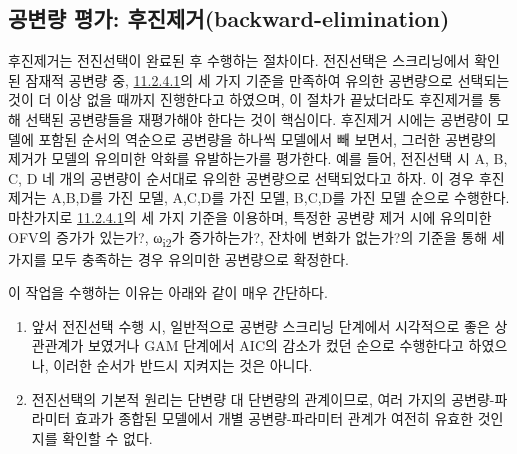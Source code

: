 \documentclass[
  10pt,
  krantz2,
  a4paper]{krantz}
\providecommand{\tightlist}{%
  \setlength{\itemsep}{0pt}\setlength{\parskip}{0pt}}
\theoremstyle{definition}
\theoremstyle{definition}
\theoremstyle{definition}
\theoremstyle{remark}
\begin{document}
\hypertarget{uxacf5uxbcc0uxb7c9-uxd3c9uxac00-uxd6c4uxc9c4uxc81cuxac70backward-elimination}{%
\subsection{\texorpdfstring{공변량 평가: 후진제거(backward-elimination)}{공변량 평가: 후진제거(backward-elimination)}}\label{uxacf5uxbcc0uxb7c9-uxd3c9uxac00-uxd6c4uxc9c4uxc81cuxac70backward-elimination}}

후진제거는 전진선택이 완료된 후 수행하는 절차이다. 전진선택은 스크리닝에서 확인된 잠재적 공변량 중, \protect\hyperlink{forward-sel-def}{11.2.4.1}의 세 가지 기준을 만족하여 유의한 공변량으로 선택되는 것이 더 이상 없을 때까지 진행한다고 하였으며, 이 절차가 끝났더라도 후진제거를 통해 선택된 공변량들을 재평가해야 한다는 것이 핵심이다. 후진제거 시에는 공변량이 모델에 포함된 순서의 역순으로 공변량을 하나씩 모델에서 빼 보면서, 그러한 공변량의 제거가 모델의 유의미한 악화를 유발하는가를 평가한다. 예를 들어, 전진선택 시 A, B, C, D 네 개의 공변량이 순서대로 유의한 공변량으로 선택되었다고 하자. 이 경우 후진 제거는 A,B,D를 가진 모델, A,C,D를 가진 모델, B,C,D를 가진 모델 순으로 수행한다. 마찬가지로 \protect\hyperlink{forward-sel-def}{11.2.4.1}의 세 가지 기준을 이용하며, 특정한 공변량 제거 시에 유의미한 OFV의 증가가 있는가?, ω\textsubscript{i2}가 증가하는가?, 잔차에 변화가 없는가?의 기준을 통해 세 가지를 모두 충족하는 경우 유의미한 공변량으로 확정한다.

이 작업을 수행하는 이유는 아래와 같이 매우 간단하다.

\begin{enumerate}
\def\labelenumi{\arabic{enumi}.}
\tightlist
\item
  앞서 전진선택 수행 시, 일반적으로 공변량 스크리닝 단계에서 시각적으로 좋은 상관관계가 보였거나 GAM 단계에서 AIC의 감소가 컸던 순으로 수행한다고 하였으나, 이러한 순서가 반드시 지켜지는 것은 아니다.
\item
  전진선택의 기본적 원리는 단변량 대 단변량의 관계이므로, 여러 가지의 공변량-파라미터 효과가 종합된 모델에서 개별 공변량-파라미터 관계가 여전히 유효한 것인지를 확인할 수 없다.
\end{enumerate}
\end{document}
